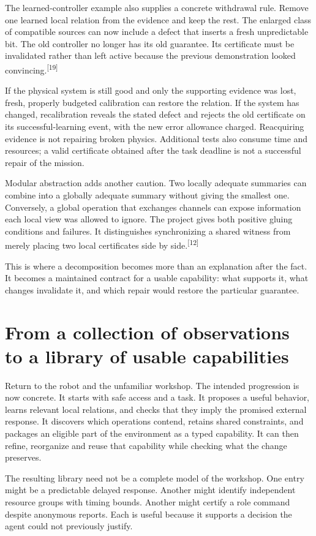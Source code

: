 \documentclass[11pt]{article}
\newcommand{\sn}[1]{\textsuperscript{[#1]}}
\begin{document}
The learned-controller example also supplies a concrete withdrawal rule. Remove one learned local relation from the evidence and keep the rest. The enlarged class of compatible sources can now include a defect that inserts a fresh unpredictable bit. The old controller no longer has its old guarantee. Its certificate must be invalidated rather than left active because the previous demonstration looked convincing.\sn{19}

If the physical system is still good and only the supporting evidence was lost, fresh, properly budgeted calibration can restore the relation. If the system has changed, recalibration reveals the stated defect and rejects the old certificate on its successful-learning event, with the new error allowance charged. Reacquiring evidence is not repairing broken physics. Additional tests also consume time and resources; a valid certificate obtained after the task deadline is not a successful repair of the mission.

Modular abstraction adds another caution. Two locally adequate summaries can combine into a globally adequate summary without giving the smallest one. Conversely, a global operation that exchanges channels can expose information each local view was allowed to ignore. The project gives both positive gluing conditions and failures. It distinguishes synchronizing a shared witness from merely placing two local certificates side by side.\sn{12}

This is where a decomposition becomes more than an explanation after the fact. It becomes a maintained contract for a usable capability: what supports it, what changes invalidate it, and which repair would restore the particular guarantee.

\section{From a collection of observations to a library of usable capabilities}

Return to the robot and the unfamiliar workshop. The intended progression is now concrete. It starts with safe access and a task. It proposes a useful behavior, learns relevant local relations, and checks that they imply the promised external response. It discovers which operations contend, retains shared constraints, and packages an eligible part of the environment as a typed capability. It can then refine, reorganize and reuse that capability while checking what the change preserves.

The resulting library need not be a complete model of the workshop. One entry might be a predictable delayed response. Another might identify independent resource groups with timing bounds. Another might certify a role command despite anonymous reports. Each is useful because it supports a decision the agent could not previously justify.
\end{document}
